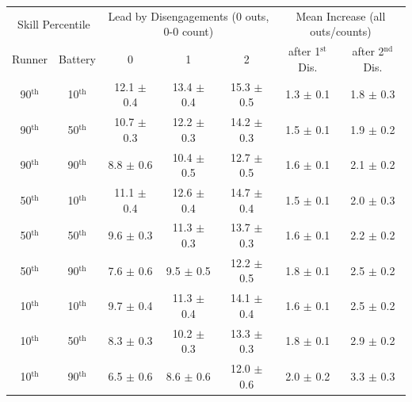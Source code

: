 \begin{tabular}{cc|ccc|cc}
\multicolumn{2}{c|}{Skill Percentile} & \multicolumn{3}{c|}{Lead by Disengagements (0 outs, 0-0 count)} & \multicolumn{2}{c}{Mean Increase (all outs/counts)}\\
Runner & Battery & 0 & 1 & 2 & after 1$^\text{{st}}$ Dis. & after 2$^\text{{nd}}$ Dis. \\
  \hline
90$^\text{th}$ & 10$^\text{th}$ & 12.1 {\color{gray}$\pm$ 0.4} & 13.4 {\color{gray}$\pm$ 0.4} & 15.3 {\color{gray}$\pm$ 0.5} & 1.3 {\color{gray}$\pm$ 0.1} & 1.8 {\color{gray}$\pm$ 0.3} \\ 
  90$^\text{th}$ & 50$^\text{th}$ & 10.7 {\color{gray}$\pm$ 0.3} & 12.2 {\color{gray}$\pm$ 0.3} & 14.2 {\color{gray}$\pm$ 0.3} & 1.5 {\color{gray}$\pm$ 0.1} & 1.9 {\color{gray}$\pm$ 0.2} \\ 
  90$^\text{th}$ & 90$^\text{th}$ & 8.8 {\color{gray}$\pm$ 0.6} & 10.4 {\color{gray}$\pm$ 0.5} & 12.7 {\color{gray}$\pm$ 0.5} & 1.6 {\color{gray}$\pm$ 0.1} & 2.1 {\color{gray}$\pm$ 0.2} \\ 
   \hline
50$^\text{th}$ & 10$^\text{th}$ & 11.1 {\color{gray}$\pm$ 0.4} & 12.6 {\color{gray}$\pm$ 0.4} & 14.7 {\color{gray}$\pm$ 0.4} & 1.5 {\color{gray}$\pm$ 0.1} & 2.0 {\color{gray}$\pm$ 0.3} \\ 
  50$^\text{th}$ & 50$^\text{th}$ & 9.6 {\color{gray}$\pm$ 0.3} & 11.3 {\color{gray}$\pm$ 0.3} & 13.7 {\color{gray}$\pm$ 0.3} & 1.6 {\color{gray}$\pm$ 0.1} & 2.2 {\color{gray}$\pm$ 0.2} \\ 
  50$^\text{th}$ & 90$^\text{th}$ & 7.6 {\color{gray}$\pm$ 0.6} & 9.5 {\color{gray}$\pm$ 0.5} & 12.2 {\color{gray}$\pm$ 0.5} & 1.8 {\color{gray}$\pm$ 0.1} & 2.5 {\color{gray}$\pm$ 0.2} \\ 
   \hline
10$^\text{th}$ & 10$^\text{th}$ & 9.7 {\color{gray}$\pm$ 0.4} & 11.3 {\color{gray}$\pm$ 0.4} & 14.1 {\color{gray}$\pm$ 0.4} & 1.6 {\color{gray}$\pm$ 0.1} & 2.5 {\color{gray}$\pm$ 0.2} \\ 
  10$^\text{th}$ & 50$^\text{th}$ & 8.3 {\color{gray}$\pm$ 0.3} & 10.2 {\color{gray}$\pm$ 0.3} & 13.3 {\color{gray}$\pm$ 0.3} & 1.8 {\color{gray}$\pm$ 0.1} & 2.9 {\color{gray}$\pm$ 0.2} \\ 
  10$^\text{th}$ & 90$^\text{th}$ & 6.5 {\color{gray}$\pm$ 0.6} & 8.6 {\color{gray}$\pm$ 0.6} & 12.0 {\color{gray}$\pm$ 0.6} & 2.0 {\color{gray}$\pm$ 0.2} & 3.3 {\color{gray}$\pm$ 0.3} \\ 
\end{tabular}
